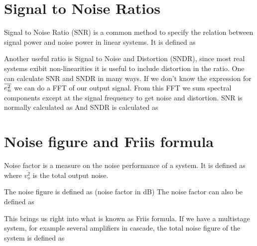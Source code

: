\documentclass[final,a4paper]{IEEEtran}
\begin{document}
\section{Signal to Noise Ratios}
Signal to Noise Ratio (SNR) is a common method to specify the relation
between signal power and noise power in linear systems. It is defined as

Another useful ratio is Signal to Noise and Distortion (SNDR), since
most real systems exibit non-linearities it is useful to include
distortion in the ratio.  One can calculate SNR and SNDR in many
ways. If we don't know the expression for $\overline{e_{n}^2}$ we can do a FFT of
our output signal. From this FFT we sum spectral components except at the
signal frequency to get noise and distortion. SNR is normally
calculated as
And SNDR is calculated as

\section{Noise figure and Friis formula}
Noise factor is a measure on the noise performance of a system. It is
defined as 
where $\overline{v_o^2}$ is the total output noise. 


The noise figure is defined as (noise factor in dB)
The noise factor can also be defined as

This brings us right into what is known as Friis formula. If we have
a multistage system, for example several amplifiers in cascade, the
total noise figure of the system is defined as 
\end{document}
